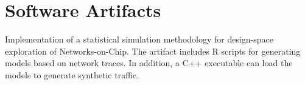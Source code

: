 \section{\sc Software Artifacts}

{
  Implementation of a statistical simulation methodology for design-space exploration of Networks-on-Chip.
  The artifact includes R scripts for generating models based on network traces.
  In addition, a C++ executable can load the models to generate synthetic traffic.
}
